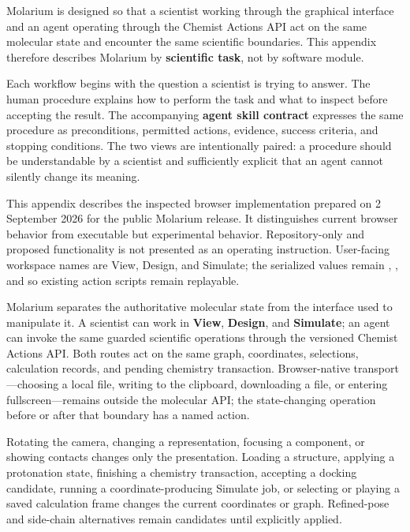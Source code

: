 Molarium is designed so that a scientist working through the graphical interface and an agent operating through the Chemist Actions API act on the same molecular state and encounter the same scientific boundaries. This appendix therefore describes Molarium by \textbf{scientific task}, not by software module.

Each workflow begins with the question a scientist is trying to answer. The human procedure explains how to perform the task and what to inspect before accepting the result. The accompanying \textbf{agent skill contract} expresses the same procedure as preconditions, permitted actions, evidence, success criteria, and stopping conditions. The two views are intentionally paired: a procedure should be understandable by a scientist and sufficiently explicit that an agent cannot silently change its meaning.

This appendix describes the inspected browser implementation prepared on 2 September 2026 for the public Molarium release. It distinguishes current browser behavior from executable but experimental behavior. Repository-only and proposed functionality is not presented as an operating instruction. User-facing workspace names are View, Design, and Simulate; the serialized values remain , , and  so existing action scripts remain replayable.


Molarium separates the authoritative molecular state from the interface used to manipulate it. A scientist can work in \textbf{View}, \textbf{Design}, and \textbf{Simulate}; an agent can invoke the same guarded scientific operations through the versioned Chemist Actions API. Both routes act on the same graph, coordinates, selections, calculation records, and pending chemistry transaction. Browser-native transport---choosing a local file, writing to the clipboard, downloading a file, or entering fullscreen---remains outside the molecular API; the state-changing operation before or after that boundary has a named action.

Rotating the camera, changing a representation, focusing a component, or showing contacts changes only the presentation. Loading a structure, applying a protonation state, finishing a chemistry transaction, accepting a docking candidate, running a coordinate-producing Simulate job, or selecting or playing a saved calculation frame changes the current coordinates or graph. Refined-pose and side-chain alternatives remain candidates until explicitly applied.

